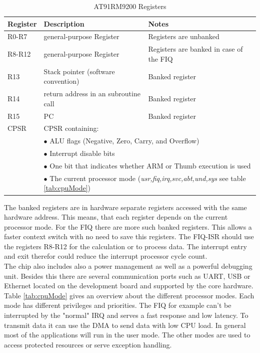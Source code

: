 \begin{table}[H]
\begin{tabular}{lll} %
\textbf{Register}	 &\textbf{Description} &\textbf{Notes}  \\
\hline
\hline
R0-R7 			& general-purpose Register & Registers are unbanked\\
R8-R12 			& general-purpose Register & Registers are banked in case of the \acs{FIQ}\\
R13 				& Stack pointer (software convention) & Banked register\\
R14 				& return address in an subroutine call & Banked register\\
R15					& \ac{PC} & Banked register\\
\hline
\hline
\acs{CPSR}	& \multicolumn{2}{l}{\acf{CPSR} containing:} \\
	& \multicolumn{2}{l}{$\bullet$ ALU flags (Negative, Zero, Carry, and Overflow)}\\
	& \multicolumn{2}{l}{$\bullet$ Interrupt disable bits}\\
  & \multicolumn{2}{l}{$\bullet$ One bit that indicates whether ARM or Thumb execution is used}\\
	&  \multicolumn{2}{l}{$\bullet$ The current processor mode (\textit{usr,fiq,irq,svc,abt,und,sys} see table \ref{tab:cpuMode})}\\



\end{tabular}
\caption{AT91RM9200 Registers}
\label{tab:regs}
\end{table}
The banked registers are in hardware separate registers accessed with the same hardware address. This means, that each register depends on the current processor mode. For the \ac{FIQ} there are more such banked registers. This allows a faster context switch with no need to save this registers. The \ac{FIQ}-\ac{ISR} should use the registers R8-R12 for the calculation or to process data. The interrupt entry and exit therefor could reduce the interrupt processor cycle count.\\
The chip also includes also a power management as well as a powerful debugging unit. Besides this there are several communication ports such as \ac{UART}, \ac{USB} or Ethernet located on the development board and supported by the core hardware.\\ 
Table \ref{tab:cpuMode} gives an overview about the different processor modes. Each mode has different privileges and priorities. The \ac{FIQ} for example can't be interrupted by the "normal" \ac{IRQ} and serves a fast response and low latency. To transmit data it can use the \ac{DMA} to send data with low \ac{CPU} load. In general most of the applications will run in the user mode. The other modes are used to access protected resources or serve exception handling.\cite{AT91Overview}\cite{AT91RTC}\cite{UNISTG}\\




